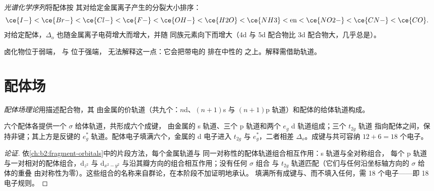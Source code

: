 \begin{definition}[光谱化学序列]\label{def:b2:ligand-field:spectrochemical}
\emph{光谱化学序列}将配体按
其对给定金属离子产生的分裂大小排序：
\[
  \ce{I-} < \ce{Br-} < \ce{Cl-} < \ce{F-} < \ce{OH-} < \ce{H2O} < \ce{NH3} < \text{en} <
  \ce{NO2-} < \ce{CN-} < \ce{CO} .
\]
对给定配体，$\Delta_o$ 也随金属离子电荷增大而增大，并随
同族元素向下而增大（4d 与 5d 配合物比 3d 配合物大，几乎总是）。
\end{definition}

卤化物位于弱端， 与  位于强端，
无法解释这一点：它会把带电的  排在中性的
 之上。解释需借助轨道。

\section{配体场}

\begin{definition}[配体场理论]\label{def:b2:ligand-field:ligand-field}
\emph{配体场理论}用描述配合物，其
由金属的价轨道（共九个：$n$d、$(n+1)$s 与 $(n+1)$p
轨道）和配体的给体轨道构成。
\end{definition}

\begin{proposition}\label{prop:b2:ligand-field:mo-octahedral}
六个配体各提供一个 $\sigma$ 给体轨道，共形成六个成键，
由金属的 s 轨道、三个 p 轨道和两个 $e_g$ d 轨道组成；三个 $t_{2g}$ 轨道
指向配体之间，保持非键；其上方是反键的 $e_g^*$
轨道。配体电子填满六个，金属的 d 电子进入
$t_{2g}$ 与 $e_g^*$，二者相差 $\Delta_o$。成键与共可容纳
$12 + 6 = 18$ 个电子。
\end{proposition}

\begin{proof}[论证]
依\cref{ch:b2:fragment-orbitals}中的片段方法，每个金属轨道与
同一对称性的配体轨道组合相互作用：s 轨道与全对称组合，
每个 p 轨道与一对相对的配体组合，$\mathrm d_{z^2}$ 与 $\mathrm
d_{x^2-y^2}$ 与沿其瓣方向的组合相互作用；没有任何 $\sigma$ 组合
与 $t_{2g}$ 轨道匹配（它们与任何沿坐标轴方向的 $\sigma$ 给体的重叠
由对称性为零）。这些组合的名称来自群论，在本阶段不加证明地承认。
填满所有成键与、而不填入任何，需
18 个电子——即 18 电子规则。
\end{proof}

